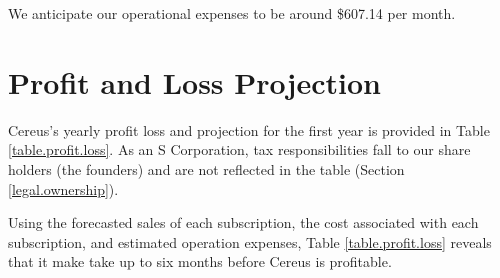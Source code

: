 We anticipate our operational expenses to be around \$607.14 per month.

\section{Profit and Loss Projection}

Cereus's yearly profit loss and projection for the first year is provided in Table \ref{table.profit.loss}. As an S Corporation, tax responsibilities fall to our share holders (the founders) and are not reflected in the table (Section \ref{legal.ownership}).

Using the forecasted sales of each subscription, the cost associated with each subscription, and estimated operation expenses, Table \ref{table.profit.loss} reveals that it make take up to six months before Cereus is profitable.

